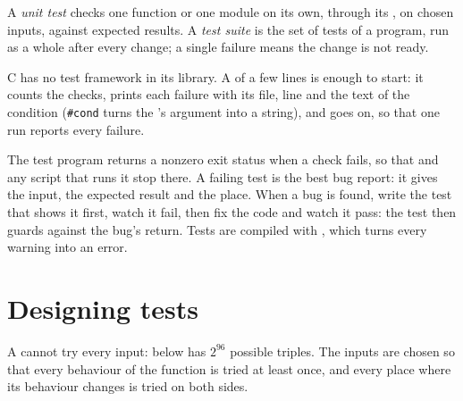 \begin{definition}\label{def:b1:c-modules-make-tests:unit-test}
A \emph{unit test} checks one function or one module on its own, through its , on chosen
inputs, against expected results. A \emph{test suite} is the set of tests of a program, run as a
whole after every change; a single failure means the change is not ready.
\end{definition}

C has no test framework in its library. A  of a few lines is enough to start: it counts the checks, prints each
failure with its file, line and the text of the condition (\texttt{\#cond} turns the 's argument into a string), and
goes on, so that one run reports every failure.

\label{lst:b1:c-modules-make-tests:check}

\label{lst:b1:c-modules-make-tests:ratio-test}


The test program returns a nonzero exit status when a check fails, so that  and any script that runs
it stop there. A failing test is the best bug report: it gives the input, the expected result and the place. When a bug
is found, write the test that shows it first, watch it fail, then fix the code and watch it pass: the test then guards
against the bug's return. Tests are compiled with , which turns every warning into an error.

\section{Designing tests}\label{sec:b1:c-modules-make-tests:design}

A  cannot try every input:  below has $2^{96}$ possible triples. The inputs are chosen so
that every behaviour of the function is tried at least once, and every place where its behaviour changes is tried on
both sides.

